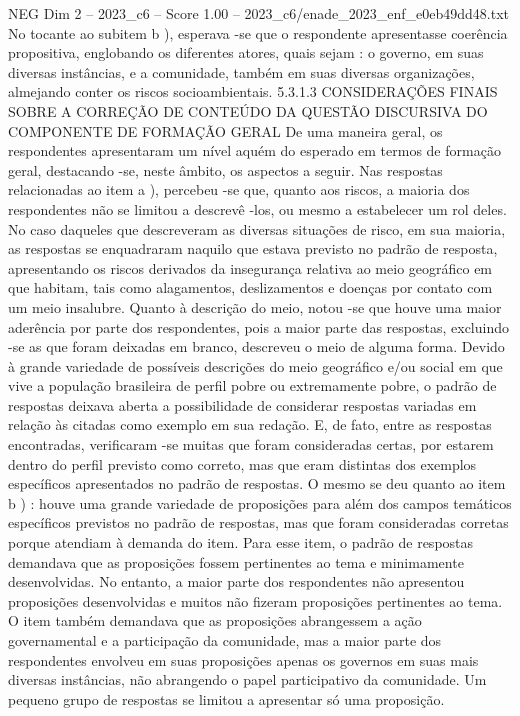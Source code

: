 \begin{textsample}{NEG Dim 2 – 2023\_c6 – Score 1.00 – 2023\_c6/enade\_2023\_enf\_e0eb49dd48.txt}
No tocante ao subitem b ), esperava -se que o respondente apresentasse coerência propositiva, englobando os diferentes atores, quais sejam : o governo, em suas diversas instâncias, e a comunidade, também em suas diversas organizações, almejando conter os riscos socioambientais. 5.3.1.3 CONSIDERAÇÕES FINAIS SOBRE A CORREÇÃO DE CONTEÚDO DA QUESTÃO DISCURSIVA DO COMPONENTE DE FORMAÇÃO GERAL De uma maneira geral, os respondentes apresentaram um nível aquém do esperado em termos de formação geral, destacando -se, neste âmbito, os aspectos a seguir.
Nas respostas relacionadas ao item a ), percebeu -se que, quanto aos riscos, a maioria dos respondentes não se limitou a descrevê -los, ou mesmo a estabelecer um rol deles.
No caso daqueles que descreveram as diversas situações de risco, em sua maioria, as respostas se enquadraram naquilo que estava previsto no padrão de resposta, apresentando os riscos derivados da insegurança relativa ao meio geográfico em que habitam, tais como alagamentos, deslizamentos e doenças por contato com um meio insalubre.
Quanto à descrição do meio, notou -se que houve uma maior aderência por parte dos respondentes, pois a maior parte das respostas, excluindo -se as que foram deixadas em branco, descreveu o meio de alguma forma.
Devido à grande variedade de possíveis descrições do meio geográfico e/ou social em que vive a população brasileira de perfil pobre ou extremamente pobre, o padrão de respostas deixava aberta a possibilidade de considerar respostas variadas em relação às citadas como exemplo em sua redação.
E, de fato, entre as respostas encontradas, verificaram -se muitas que foram consideradas certas, por estarem dentro do perfil previsto como correto, mas que eram distintas dos exemplos específicos apresentados no padrão de respostas.
O mesmo se deu quanto ao item b ) : houve uma grande variedade de proposições para além dos campos temáticos específicos previstos no padrão de respostas, mas que foram consideradas corretas porque atendiam à demanda do item.
Para esse item, o padrão de respostas demandava que as proposições fossem pertinentes ao tema e minimamente desenvolvidas.
No entanto, a maior parte dos respondentes não apresentou proposições desenvolvidas e muitos não fizeram proposições pertinentes ao tema.
O item também demandava que as proposições abrangessem a ação governamental e a participação da comunidade, mas a maior parte dos respondentes envolveu em suas proposições apenas os governos em suas mais diversas instâncias, não abrangendo o papel participativo da comunidade.
Um pequeno grupo de respostas se limitou a apresentar só uma proposição.

\end{textsample}
